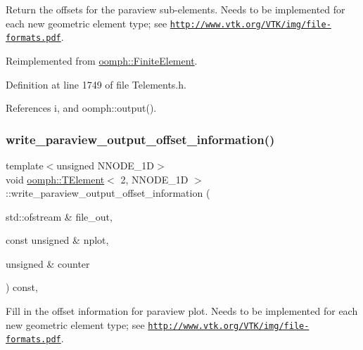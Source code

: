Return the offsets for the paraview sub-\/elements. Needs to be implemented for each new geometric element type; see \href{http://www.vtk.org/VTK/img/file-formats.pdf}{\tt http\+://www.\+vtk.\+org/\+V\+T\+K/img/file-\/formats.\+pdf}. 



Reimplemented from \hyperlink{classoomph_1_1FiniteElement_af11d35779224185e6693f2db450cc111}{oomph\+::\+Finite\+Element}.



Definition at line 1749 of file Telements.\+h.



References i, and oomph\+::output().

\mbox{\label{classoomph_1_1TElement_3_012_00_01NNODE__1D_01_4_a74e9ef1bdd8bbf4d7c2300004c13a151}} 
\subsubsection{\texorpdfstring{write\+\_\+paraview\+\_\+output\+\_\+offset\+\_\+information()}{write\_paraview\_output\_offset\_information()}}
{\footnotesize\ttfamily template$<$unsigned N\+N\+O\+D\+E\+\_\+1D$>$ \\
void \hyperlink{classoomph_1_1TElement}{oomph\+::\+T\+Element}$<$ 2, N\+N\+O\+D\+E\+\_\+1D $>$\+::write\+\_\+paraview\+\_\+output\+\_\+offset\+\_\+information (\begin{DoxyParamCaption}\item[{std\+::ofstream \&}]{file\+\_\+out,  }\item[{const unsigned \&}]{nplot,  }\item[{unsigned \&}]{counter }\end{DoxyParamCaption}) const\hspace{0.3cm}{\ttfamily [inline]}, {\ttfamily [virtual]}}



Fill in the offset information for paraview plot. Needs to be implemented for each new geometric element type; see \href{http://www.vtk.org/VTK/img/file-formats.pdf}{\tt http\+://www.\+vtk.\+org/\+V\+T\+K/img/file-\/formats.\+pdf}. 



